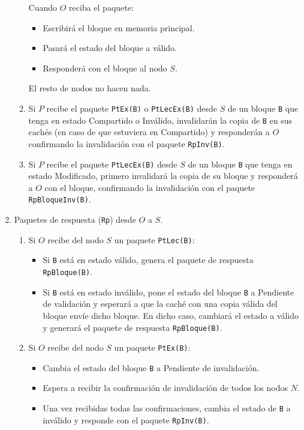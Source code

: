 \begin{enumerate}
\begin{enumerate}
        Cuando $O$ reciba el paquete:
        \begin{itemize}
            \item Escribirá el bloque en memoria principal.
            \item Pasará el estado del bloque a válido.
            \item Responderá con el bloque al nodo $S$.
        \end{itemize}
        El resto de nodos no hacen nada.
        \item Si $P$ recibe el paquete \verb|PtEx(B)| o \verb|PtLecEx(B)| desde $S$ de un bloque \verb|B| que tenga en estado Compartido o Inválido, invalidarán la copia de \verb|B| en sus cachés (en caso de que estuviera en Compartido) y responderán a $O$ confirmando la invalidación con el paquete \verb|RpInv(B)|.
        \item Si $P$ recibe el paquete \verb|PtLecEx(B)| desde $S$ de un bloque \verb|B| que tenga en estado Modificado, primero invalidará la copia de su bloque y responderá a $O$ con el bloque, confirmando la invalidación con el paquete \verb|RpBloqueInv(B)|.
    \end{enumerate}
    \item Paquetes de respuesta (\verb|Rp|) desde $O$ a $S$.
    \begin{enumerate}
        \item Si $O$ recibe del nodo $S$ un paquete \verb|PtLec(B)|:
            \begin{itemize}
                \item Si \verb|B| está en estado válido, genera el paquete de respuesta \verb|RpBloque(B)|.
                \item Si \verb|B| está en estado inválido, pone el estado del bloque \verb|B| a Pendiente de validación y esperará a que la caché con una copia válida del bloque envíe dicho bloque. En dicho caso, cambiará el estado a válido y generará el paquete de respuesta \verb|RpBloque(B)|.
            \end{itemize}
        \item Si $O$ recibe del nodo $S$ un paquete \verb|PtEx(B)|:
            \begin{itemize}
                \item Cambia el estado del bloque \verb|B| a Pendiente de invalidación.
                \item Espera a recibir la confirmación de invalidación de todos los nodos $N$.
                \item Una vez recibidas todas las confirmaciones, cambia el estado de \verb|B| a inválido y responde con el paquete \verb|RpInv(B)|.

\end{itemize}
\end{enumerate}
\end{enumerate}
